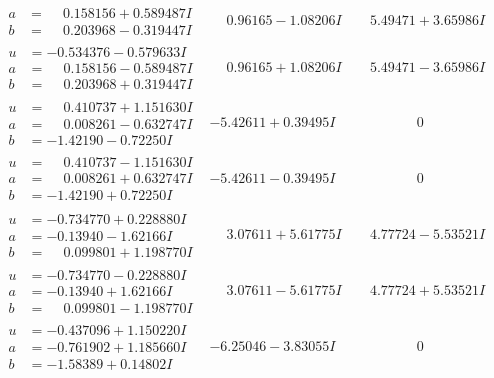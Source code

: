 \documentclass[1p]{elsarticle_modified}
\theoremstyle{definition}
\begin{document}
$$\begin{array}{c|c|c}
\begin{aligned}
a &= \phantom{-}0.158156 + 0.589487 I \\
b &= \phantom{-}0.203968 - 0.319447 I\end{aligned}
 & \phantom{-}0.96165 - 1.08206 I & \phantom{-}5.49471 + 3.65986 I \\ \hline\begin{aligned}
u &= -0.534376 - 0.579633 I \\
a &= \phantom{-}0.158156 - 0.589487 I \\
b &= \phantom{-}0.203968 + 0.319447 I\end{aligned}
 & \phantom{-}0.96165 + 1.08206 I & \phantom{-}5.49471 - 3.65986 I \\ \hline\begin{aligned}
u &= \phantom{-}0.410737 + 1.151630 I \\
a &= \phantom{-}0.008261 - 0.632747 I \\
b &= -1.42190 - 0.72250 I\end{aligned}
 & -5.42611 + 0.39495 I & \phantom{-0.000000 } 0 \\ \hline\begin{aligned}
u &= \phantom{-}0.410737 - 1.151630 I \\
a &= \phantom{-}0.008261 + 0.632747 I \\
b &= -1.42190 + 0.72250 I\end{aligned}
 & -5.42611 - 0.39495 I & \phantom{-0.000000 } 0 \\ \hline\begin{aligned}
u &= -0.734770 + 0.228880 I \\
a &= -0.13940 - 1.62166 I \\
b &= \phantom{-}0.099801 + 1.198770 I\end{aligned}
 & \phantom{-}3.07611 + 5.61775 I & \phantom{-}4.77724 - 5.53521 I \\ \hline\begin{aligned}
u &= -0.734770 - 0.228880 I \\
a &= -0.13940 + 1.62166 I \\
b &= \phantom{-}0.099801 - 1.198770 I\end{aligned}
 & \phantom{-}3.07611 - 5.61775 I & \phantom{-}4.77724 + 5.53521 I \\ \hline\begin{aligned}
u &= -0.437096 + 1.150220 I \\
a &= -0.761902 + 1.185660 I \\
b &= -1.58389 + 0.14802 I\end{aligned}
 & -6.25046 - 3.83055 I & \phantom{-0.000000 } 0 \\ \hline\begin{aligned}

\end{aligned}
\end{array}$$
\end{document}
